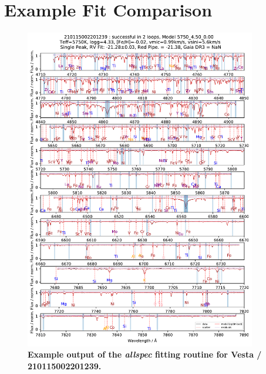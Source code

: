 \documentclass[
  journal=pasa,
  manuscript=research-paper, %
  year=2023,
  volume=37
]{cup-journal}
\begin{document}
\section{Example Fit Comparison}

\begin{figure}[ht]
 \centering
 \includegraphics[width=0.9\textwidth]{figures/210115002201239_single_fit_comparison.pdf} \caption{\textbf{Example output of the \textit{allspec} fitting routine for Vesta / 210115002201239.}} \label{fig:210115002201239_single_fit_comparison}
\end{figure}
\end{document}
